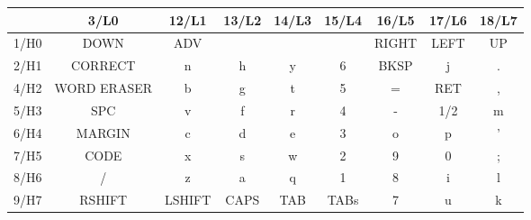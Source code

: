 \documentclass[10pt,letterpaper,unboxed,cm, fleqn]{article}
\begin{document}
\begin{tabular}{|c|c|c|c|c|c|c|c|c|}
    \hline
    & 3/L0 & 12/L1 & 13/L2 & 14/L3 & 15/L4 & 16/L5 & 17/L6 & 18/L7 \\
    \hline
    1/H0 & DOWN & ADV & & & & RIGHT & LEFT & UP \\
    \hline
    2/H1 & CORRECT & n & h & y & 6 & BKSP & j & . \\
    \hline
    4/H2 & WORD ERASER & b & g & t & 5 & = & RET & , \\
    \hline
    5/H3 & SPC & v & f & r & 4 & - & 1/2 & m \\
    \hline
    6/H4 & MARGIN & c & d & e & 3 & o & p & ' \\
    \hline
    7/H5 & CODE & x & s & w & 2 & 9 & 0 & ; \\
    \hline
    8/H6 & / & z & a & q & 1 & 8 & i & l \\
    \hline
    9/H7 & RSHIFT & LSHIFT & CAPS & TAB & TABs & 7 & u & k \\
    \hline
\end{tabular}
\end{document}
